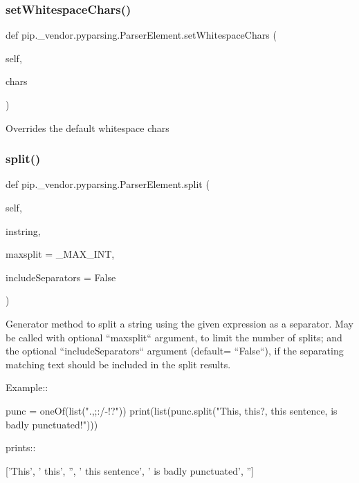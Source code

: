 \subsubsection{\texorpdfstring{set\+Whitespace\+Chars()}{setWhitespaceChars()}}
{\footnotesize\ttfamily def pip.\+\_\+vendor.\+pyparsing.\+Parser\+Element.\+set\+Whitespace\+Chars (\begin{DoxyParamCaption}\item[{}]{self,  }\item[{}]{chars }\end{DoxyParamCaption})}

\begin{DoxyVerb}Overrides the default whitespace chars
\end{DoxyVerb}
 \mbox{\label{classpip_1_1__vendor_1_1pyparsing_1_1ParserElement_a54e5d160b02e08447f1ae58e65dcaaf2}} 
\subsubsection{\texorpdfstring{split()}{split()}}
{\footnotesize\ttfamily def pip.\+\_\+vendor.\+pyparsing.\+Parser\+Element.\+split (\begin{DoxyParamCaption}\item[{}]{self,  }\item[{}]{instring,  }\item[{}]{maxsplit = {\ttfamily \+\_\+MAX\+\_\+INT},  }\item[{}]{include\+Separators = {\ttfamily False} }\end{DoxyParamCaption})}

\begin{DoxyVerb}Generator method to split a string using the given expression as a separator.
May be called with optional ``maxsplit`` argument, to limit the number of splits;
and the optional ``includeSeparators`` argument (default= ``False``), if the separating
matching text should be included in the split results.

Example::

    punc = oneOf(list(".,;:/-!?"))
    print(list(punc.split("This, this?, this sentence, is badly punctuated!")))

prints::

    ['This', ' this', '', ' this sentence', ' is badly punctuated', '']
\end{DoxyVerb}
 \mbox{\label{classpip_1_1__vendor_1_1pyparsing_1_1ParserElement_a976b8a0a7a90121bc3969dd280dab3d0}} 
